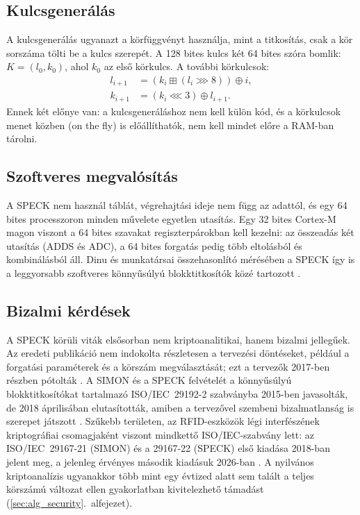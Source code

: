 \documentclass[a4paper,12pt]{report}
\theoremstyle{definition}
\theoremstyle{remark}
\begin{document}
\subsection{Kulcsgenerálás}\label{sec:speck_kulcs}

A kulcsgenerálás ugyanazt a körfüggvényt használja, mint a titkosítás, csak a kör sorszáma tölti be a kulcs szerepét. A 128 bites kulcs két 64 bites szóra bomlik: $K = (l_0, k_0)$, ahol $k_0$ az első körkulcs. A további körkulcsok:
\begin{align}
l_{i+1} &= (k_i \mathbin{\boxplus} (l_i \ggg 8)) \oplus i, \\
k_{i+1} &= (k_i \lll 3) \oplus l_{i+1}.
\end{align}
Ennek két előnye van: a kulcsgeneráláshoz nem kell külön kód, és a körkulcsok menet közben (on the fly) is előállíthatók, nem kell mindet előre a RAM-ban tárolni.

\subsection{Szoftveres megvalósítás}

A SPECK nem használ táblát, végrehajtási ideje nem függ az adattól, és egy 64 bites processzoron minden művelete egyetlen utasítás. Egy 32 bites Cortex-M magon viszont a 64 bites szavakat regiszterpárokban kell kezelni: az összeadás két utasítás (ADDS és ADC), a 64 bites forgatás pedig több eltolásból és kombinálásból áll. Dinu és munkatársai összehasonlító mérésében a SPECK így is a leggyorsabb szoftveres könnyűsúlyú blokktitkosítók közé tartozott \cite{Dinu2015}.

\subsection{Bizalmi kérdések}

A SPECK körüli viták elsősorban nem kriptoanalitikai, hanem bizalmi jellegűek. Az eredeti publikáció nem indokolta részletesen a tervezési döntéseket, például a forgatási paraméterek és a körszám megválasztását; ezt a tervezők 2017-ben részben pótolták \cite{Beaulieu2017}. A SIMON és a SPECK felvételét a könnyűsúlyú blokktitkosítókat tartalmazó ISO/IEC~29192-2 szabványba 2015-ben javasolták, de 2018 áprilisában elutasították, amiben a tervezővel szembeni bizalmatlanság is szerepet játszott \cite{Ashur2021}. Szűkebb területen, az RFID-eszközök légi interfészének kriptográfiai csomagjaként viszont mindkettő ISO/IEC-szabvány lett: az ISO/IEC~29167-21 (SIMON) és a 29167-22 (SPECK) első kiadása 2018-ban jelent meg, a jelenleg érvényes második kiadásuk 2026-ban \cite{ISO29167SIMON,ISO29167}. A nyilvános kriptoanalízis ugyanakkor több mint egy évtized alatt sem talált a teljes körszámú változat ellen gyakorlatban kivitelezhető támadást (\ref{sec:alg_security}.~alfejezet).
\end{document}
